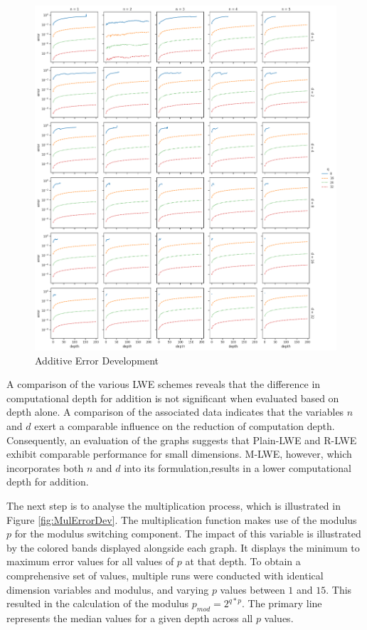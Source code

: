 \begin{figure}[ht!]
  \centering
  \includegraphics[scale=0.38]{images/AddErrorDevelopment.png}
  \caption[Additive Error Development]{Additive Error Development}
  \label{fig:AddErrorDev}
\end{figure}

A comparison of the various LWE schemes reveals that the difference in computational depth for addition is not significant when evaluated based on depth alone. A comparison of the associated data indicates that the variables $n$ and $d$ exert a comparable influence on the reduction of computation depth. Consequently, an evaluation of the graphs suggests that Plain-LWE and R-LWE exhibit comparable performance for small dimensions. M-LWE, however, which incorporates both $n$ and $d$ into its formulation,results in a lower computational depth for addition.


The next step is to analyse the multiplication process, which is illustrated in Figure \ref{fig:MulErrorDev}. The multiplication function makes use of the modulus $p$ for the modulus switching component. The impact of this variable is illustrated by the colored bands displayed alongside each graph. It displays the minimum to maximum error values for all values of $p$ at that depth. To obtain a comprehensive set of values, multiple runs were conducted with identical dimension variables and modulus, and varying $p$ values between $1$ and $15$. This resulted in the calculation of the modulus $p_{mod}=2^{q*p}$. The primary line represents the median values for a given depth across all $p$ values.

